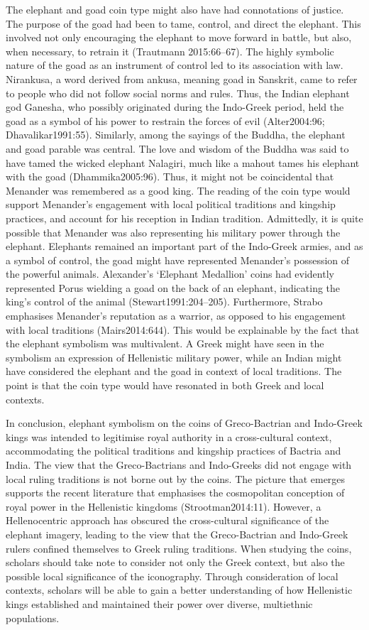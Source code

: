 \documentclass{ijsra}
\begin{document}
The elephant and goad coin type might also have had connotations of justice.
The purpose of the goad had been to tame, control, and direct the elephant. 
This involved not only encouraging the elephant to move forward in battle, but also, when necessary, to retrain it (Trautmann 2015:66–67). 
The highly symbolic nature of the goad as an instrument of control led to its association with law. 
Nirankusa, a word derived from ankusa, meaning goad in Sanskrit, came to refer to people who did not follow social norms and rules. 
Thus, the Indian elephant god Ganesha, who possibly originated during the Indo-Greek period, 
held the goad as a symbol of his power to restrain the forces of evil (Alter2004:96; Dhavalikar1991:55). 
Similarly, among the sayings of the Buddha, the elephant and goad parable was central. 
The love and wisdom of the Buddha was said to have tamed the wicked elephant Nalagiri, 
much like a mahout tames his elephant with the goad (Dhammika2005:96). 
Thus, it might not be coincidental that Menander was remembered as a good king. 
The reading of the coin type would support Menander’s engagement with local political traditions and kingship practices,
and account for his reception in Indian tradition. 
Admittedly, it is quite possible that Menander was also representing his military power through the elephant. 
Elephants remained an important part of the Indo-Greek armies, and as a symbol of control,
the goad might have represented Menander’s possession of the powerful animals.
Alexander’s ‘Elephant Medallion’ coins had evidently represented Porus wielding a goad on the back of an elephant,
indicating the king’s control of the animal (Stewart1991:204–205).
Furthermore, Strabo emphasises Menander’s reputation as a warrior, as opposed to his engagement with local traditions (Mairs2014:644).
This would be explainable by the fact that the elephant symbolism was multivalent. 
A Greek might have seen in the symbolism an expression of Hellenistic military power,
while an Indian might have considered the elephant and the goad in context of local traditions. 
The point is that the coin type would have resonated in both Greek and local contexts.

In conclusion, elephant symbolism on the coins of Greco-Bactrian and Indo-Greek kings was intended to legitimise
royal authority in a cross-cultural context, accommodating the political traditions and kingship practices of Bactria and India.
The view that the Greco-Bactrians and Indo-Greeks did not engage with local ruling traditions is not borne out by the coins.
The picture that emerges supports the recent literature that emphasises the cosmopolitan conception of royal power in
the Hellenistic kingdoms (Strootman2014:11).
However, a Hellenocentric approach has obscured the cross-cultural significance of the elephant imagery,
leading to the view that the Greco-Bactrian and Indo-Greek rulers confined themselves to Greek ruling traditions. 
When studying the coins, scholars should take note to consider not only the Greek context,
but also the possible local significance of the iconography. 
Through consideration of local contexts, scholars will be able to gain a better understanding of how Hellenistic kings
established and maintained their power over diverse, multiethnic populations.
\IJSRAclosing%
\end{document}
